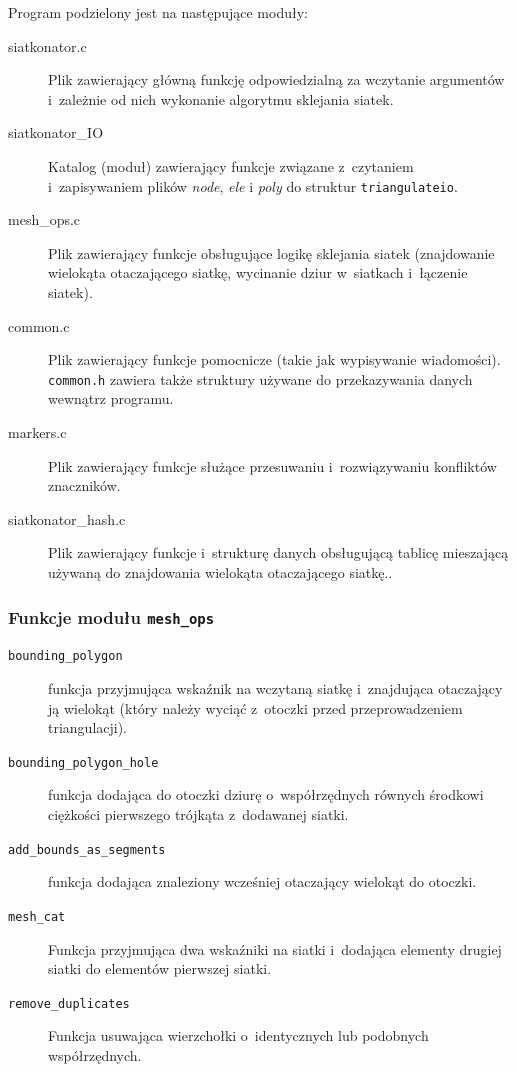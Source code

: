 \documentclass[a4paper]{article} \usepackage{setspace}
\begin{document}
  Program podzielony jest na następujące moduły:
  \begin{description}
    \item[siatkonator.c] Plik zawierający główną funkcję odpowiedzialną za wczytanie argumentów i~zależnie od nich wykonanie algorytmu sklejania siatek.
    \item[siatkonator\_IO] Katalog (moduł) zawierający funkcje związane z~czytaniem i~zapisywaniem plików \emph{node}, \emph{ele} i \emph{poly} do struktur \texttt{triangulateio}.
    \item[mesh\_ops.c] Plik zawierający funkcje obsługujące logikę sklejania siatek (znajdowanie wielokąta otaczającego siatkę, wycinanie dziur w~siatkach i~łączenie siatek).
    \item[common.c] Plik zawierający funkcje pomocnicze (takie jak wypisywanie wiadomości). \texttt{common.h} zawiera także struktury używane do przekazywania danych wewnątrz programu.
    \item[markers.c] Plik zawierający funkcje służące przesuwaniu i~rozwiązywaniu konfliktów znaczników.
    \item[siatkonator\_hash.c] Plik zawierający funkcje i~strukturę danych obsługującą tablicę mieszającą używaną do znajdowania wielokąta otaczającego siatkę..
  \end{description}

\subsubsection{Funkcje modułu \texttt{mesh\_ops}}
\begin{description}
  \item[\texttt{bounding\_polygon}] funkcja przyjmująca wskaźnik na wczytaną siatkę i~znajdująca otaczający ją wielokąt (który należy wyciąć z~otoczki przed przeprowadzeniem triangulacji).
  \item[\texttt{bounding\_polygon\_hole}] funkcja dodająca do otoczki dziurę o~współrzędnych równych środkowi ciężkości pierwszego trójkąta z~dodawanej siatki.
  \item[\texttt{add\_bounds\_as\_segments}] funkcja dodająca znaleziony wcześniej otaczający wielokąt do otoczki.
  \item[\texttt{mesh\_cat}] Funkcja przyjmująca dwa wskaźniki na siatki i~dodająca elementy drugiej siatki do elementów pierwszej siatki.
  \item[\texttt{remove\_duplicates}] Funkcja usuwająca wierzchołki o~identycznych lub podobnych współrzędnych.
\end{description}
\end{document}
